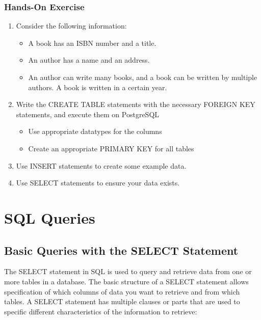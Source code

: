 \begin{tcolorbox}[colback=code]
\subsubsection*{Hands-On Exercise}
\begin{enumerate}
  \item Consider the following information:
	\begin{itemize}
	  \item A book has an ISBN number and a title. 
	  \item An author has a name and an address. 
	  \item An author can write many books, and a book can be written by multiple authors. A book is written in a certain year.
	\end{itemize}
  \item Write the CREATE TABLE statements with the necessary FOREIGN KEY statements, and execute them on PostgreSQL
  \begin{itemize}
    \item Use appropriate datatypes for the columns
    \item Create an appropriate PRIMARY KEY for all tables
  \end{itemize}
  \item Use INSERT statements to create some example data.
  \item Use SELECT statements to ensure your data exists.
\end{enumerate}
\end{tcolorbox}

\section{SQL Queries}

\subsection*{Basic Queries with the SELECT Statement}

The SELECT statement in SQL is used to query and retrieve data from one or more tables in a database. The basic structure of a SELECT statement allows specification of which columns of data you want to retrieve and from which tables. A SELECT statement has multiple clauses or parts that are used to specific different characteristics of the information to retrieve:

